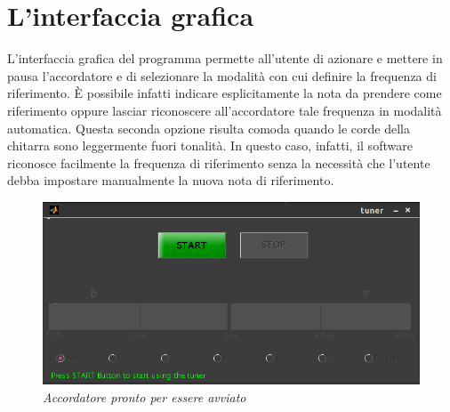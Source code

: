 \chapter*{L'interfaccia grafica}\label{cap:interfaccia}

L'interfaccia grafica del programma permette all'utente di azionare e mettere in pausa l'accordatore e di selezionare la modalità con cui definire la frequenza di riferimento.
È possibile infatti indicare esplicitamente la nota da prendere come riferimento oppure lasciar riconoscere all'accordatore tale frequenza in modalità automatica.
Questa seconda opzione risulta comoda quando le corde della chitarra sono leggermente fuori tonalità.
In questo caso, infatti, il software riconosce facilmente la frequenza di riferimento senza la necessità che l'utente debba impostare manualmente la nuova nota di riferimento.

	\begin{figure}[h]
	  \begin{center} 
	    \includegraphics[width=\textwidth*\real{0.8}]{images/ch_07/accordatore_fermo.png}
	  \end{center} 
	  \caption{\textit{Accordatore pronto per essere avviato}}  
	  \label{fig:accordatore_fermo}
	\end{figure}

